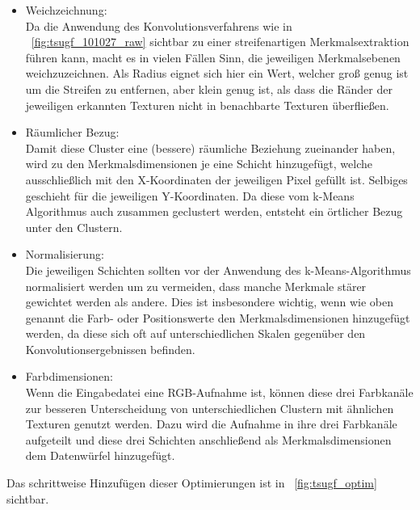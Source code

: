 \begin{itemize}
	\item Weichzeichnung:\\
	Da die Anwendung des Konvolutionsverfahrens wie in \figurename~\ref{fig:tsugf_101027_raw} sichtbar zu einer streifenartigen Merkmalsextraktion führen kann, macht es in vielen Fällen Sinn, die jeweiligen Merkmalsebenen weichzuzeichnen. Als Radius eignet sich hier ein Wert, welcher groß genug ist um die Streifen zu entfernen, aber klein genug ist, als dass die Ränder der jeweiligen erkannten Texturen nicht in benachbarte Texturen überfließen.
	\item Räumlicher Bezug:\\
	Damit diese Cluster eine (bessere) räumliche Beziehung zueinander haben, wird zu den Merkmalsdimensionen je eine Schicht hinzugefügt, welche ausschließlich mit den X-Koordinaten der jeweiligen Pixel gefüllt ist. Selbiges geschieht für die jeweiligen Y-Koordinaten. Da diese vom k-Means Algorithmus auch zusammen geclustert werden, entsteht ein örtlicher Bezug unter den Clustern.
	\item Normalisierung:\\
	Die jeweiligen Schichten sollten vor der Anwendung des k-Means-Algorithmus normalisiert werden um zu vermeiden, dass manche Merkmale stärer gewichtet werden als andere. Dies ist insbesondere wichtig, wenn wie oben genannt die Farb- oder Positionswerte den Merkmalsdimensionen hinzugefügt werden, da diese sich oft auf unterschiedlichen Skalen gegenüber den Konvolutionsergebnissen befinden.
	\item Farbdimensionen:\\
	Wenn die Eingabedatei eine RGB-Aufnahme ist, können diese drei Farbkanäle zur besseren Unterscheidung von unterschiedlichen Clustern mit ähnlichen Texturen genutzt werden. Dazu wird die Aufnahme in ihre drei Farbkanäle aufgeteilt und diese drei Schichten anschließend als Merkmalsdimensionen dem Datenwürfel hinzugefügt.
\end{itemize}

Das schrittweise Hinzufügen dieser Optimierungen ist in \figurename~\ref{fig:tsugf_optim} sichtbar.

